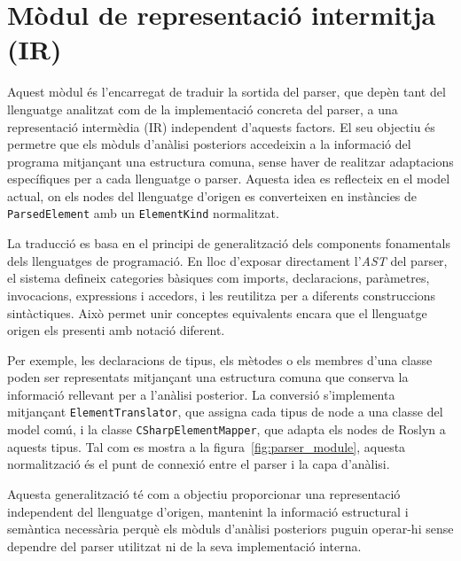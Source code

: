 \section*{Mòdul de representació intermitja (IR)}
Aquest mòdul és l'encarregat de traduir la sortida del parser, que depèn tant del llenguatge analitzat com de la implementació concreta del parser, a una representació intermèdia (IR) independent d'aquests factors. El seu objectiu és permetre que els mòduls d'anàlisi posteriors accedeixin a la informació del programa mitjançant una estructura comuna, sense haver de realitzar adaptacions específiques per a cada llenguatge o parser. Aquesta idea es reflecteix en el model actual, on els nodes del llenguatge d'origen es converteixen en instàncies de \texttt{ParsedElement} amb un \texttt{ElementKind} normalitzat.

La traducció es basa en el principi de generalització dels components fonamentals dels llenguatges de programació. En lloc d'exposar directament l'\textit{AST} del parser, el sistema defineix categories bàsiques com imports, declaracions, paràmetres, invocacions, expressions i accedors, i les reutilitza per a diferents construccions sintàctiques. Això permet unir conceptes equivalents encara que el llenguatge origen els presenti amb notació diferent.

Per exemple, les declaracions de tipus, els mètodes o els membres d'una classe poden ser representats mitjançant una estructura comuna que conserva la informació rellevant per a l'anàlisi posterior. La conversió s'implementa mitjançant \texttt{ElementTranslator}, que assigna cada tipus de node a una classe del model comú, i la classe \texttt{CSharpElementMapper}, que adapta els nodes de Roslyn a aquests tipus. Tal com es mostra a la figura~\ref{fig:parser_module}, aquesta normalització és el punt de connexió entre el parser i la capa d'anàlisi.

Aquesta generalització té com a objectiu proporcionar una representació independent del llenguatge d'origen, mantenint la informació estructural i semàntica necessària perquè els mòduls d'anàlisi posteriors puguin operar-hi sense dependre del parser utilitzat ni de la seva implementació interna.


